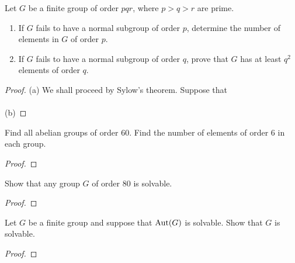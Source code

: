\begin{problem}
Let $G$ be a finite group of order $pqr$, where $p>q>r$ are
prime.
\begin{enumerate}[label=(\alph*)]
\item If $G$ fails to have a normal subgroup of order $p$,
determine the number of elements in $G$ of order $p$.
\item If $G$ fails to have a normal subgroup of order $q$,
prove that $G$ has at least $q^2$ elements of order $q$.
\end{enumerate}
\end{problem}
\begin{proof}
(a) We shall proceed by Sylow's theorem. Suppose that
\\\\
(b)
\end{proof}

\begin{problem}
Find all abelian groups of order $60$. Find the number of
elements of order $6$ in each group. %
\end{problem}
\begin{proof}
\end{proof}

\begin{problem}
Show that any group $G$ of order $80$ is solvable.
\end{problem}
\begin{proof}
\end{proof}

\begin{problem}
Let $G$ be a finite group and suppose that $\operatorname{Aut}(G)$ is
solvable. Show that $G$ is solvable.
\end{problem}
\begin{proof}
\end{proof}

